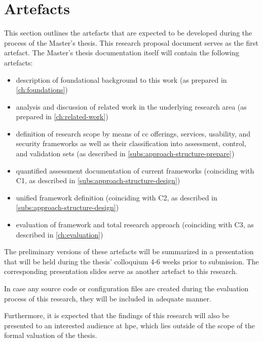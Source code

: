 
	\section{Artefacts} \label{sec:organization-deliverables}
	This section outlines the artefacts that are expected to be developed during the process of the Master's thesis. This research proposal document serves as the first artefact. The Master's thesis documentation itself will contain the following artefacts:
	
	\begin{itemize}
		\item description of foundational background to this work (as prepared in \autoref{ch:foundations})
		\item analysis and discussion of related work in the underlying research area (as prepared in \autoref{ch:related-work})
		\item definition of research scope by means of \ac{cc} offerings, services, usability, and security frameworks as well as their classification into assessment, control, and validation sets (as described in \autoref{subs:approach-structure-prepare})
		\item quantified assessment documentation of current frameworks (coinciding with C1, as described in \autoref{subs:approach-structure-design})
		\item unified framework definition (coinciding with C2, as described in \autoref{subs:approach-structure-design})
		\item evaluation of framework and total research approach (coinciding with C3, as described in \autoref{ch:evaluation})
	\end{itemize}
	
	The preliminary versions of these artefacts will be summarized in a presentation that will be held during the thesis' colloquium 4-6 weeks prior to submission. The corresponding presentation slides serve as another artefact to this research.
	
	In case any source code or configuration files are created during the evaluation process of this research, they will be included in adequate manner.
	
	Furthermore, it is expected that the findings of this research will also be presented to an interested audience at \ac{hpe}, which lies outside of the scope of the formal valuation of the thesis.

